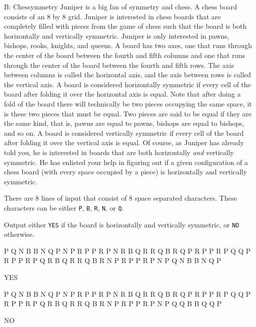 \begin{problem}{B: Chessymmetry} 
Juniper is a big fan of symmetry and chess.
A chess board consists of an 8 by 8 grid.
Juniper is interested in chess boards that are completely filled with pieces from the game of chess such that the board is both horizontally and vertically symmetric.
Juniper is only interested in pawns, bishops, rooks, knights, and queens.
A board has two axes, one that runs through the center of the board between the fourth and fifth columns and one that runs through the center of the board between the fourth and fifth rows.
The axis between columns is called the horizontal axis, and the axis between rows is called the vertical axis.
A board is considered horizontally symmetric if every cell of the board after folding it over the horizontal axis is equal.
Note that after doing a fold of the board there will technically be two pieces occupying the same space, it is these two pieces that must be equal.
Two pieces are said to be equal if they are the same kind, that is, pawns are equal to pawns, bishops are equal to bishops, and so on.
A board is considered vertically symmetric if every cell of the board after folding it over the vertical axis is equal.
Of course, as Juniper has already told you, he is interested in boards that are both horizontally \textit{and} vertically symmetric.
He has enlisted your help in figuring out if a given configuration of a chess board (with every space occupied by a piece) is horizontally and vertically symmetric.
\end{problem}

\begin{formalin}
There are 8 lines of input that consist of 8 space separated characters.
These characters can be either \texttt{P}, \texttt{B}, \texttt{R}, \texttt{N}, or \texttt{Q}.
\end{formalin}

\begin{formalout}
Output either \texttt{YES} if the board is horizontally and vertically symmetric, or \texttt{NO} otherwise. 
\end{formalout}

\begin{datain}
P Q N B B N Q P
N P R P P R P N
R B Q R R Q B R
Q P R P P R P Q
Q P R P P R P Q
R B Q R R Q B R
N P R P P R P N
P Q N B B N Q P
\end{datain}
\begin{dataout}
YES
\end{dataout}

\begin{datain}
P Q N B B N Q P
N P R P P R P N
R B Q R R Q B R
Q P R P P R P Q
Q P R P P R P Q
R B Q R R Q B R
N P R P P R P N
P Q Q B B Q Q P
\end{datain}
\begin{dataout}
NO
\end{dataout}
